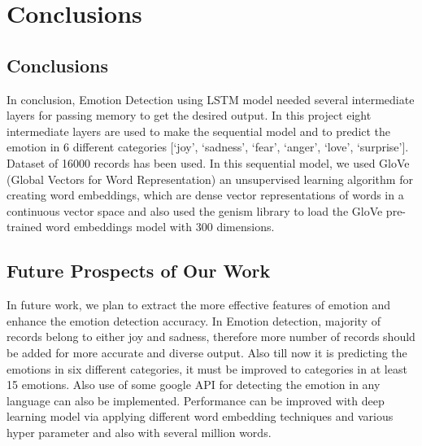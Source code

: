 \chapter{Conclusions}\label{ch:conclusion}

\section{Conclusions}
In conclusion, Emotion Detection using LSTM model needed several intermediate layers for passing memory to get the desired output. In this project eight intermediate
layers are used to make the sequential model and to predict the emotion in 6 different categories [‘joy’, ‘sadness’, ‘fear’, ‘anger’, ‘love’, ‘surprise’]. Dataset of 16000 records has been used. In this sequential model, we used GloVe (Global Vectors for Word Representation) an unsupervised learning algorithm for creating word embeddings, which are dense vector representations of words in a continuous vector space and also used the genism library to load the GloVe pre-trained word embeddings model with 300 dimensions.

\section{Future Prospects of Our Work}
In future work, we plan to extract the more effective features of emotion and enhance the emotion detection accuracy. In Emotion detection, majority of records belong to either joy and sadness, therefore more number of records should be added for more accurate and diverse output. Also till now it is predicting the emotions in six different categories, it must be improved to categories in at least 15 emotions. Also use of some google API for detecting the emotion in any language can also be implemented. Performance can be improved with deep learning model via applying different word embedding techniques and various hyper parameter and also with several million words.
